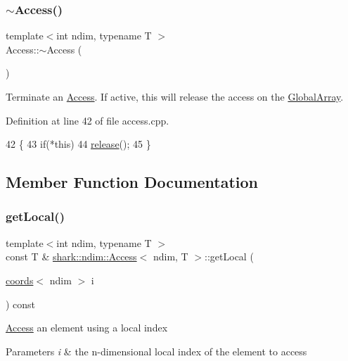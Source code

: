 \subsubsection{\texorpdfstring{$\sim$\+Access()}{~Access()}}
{\footnotesize\ttfamily template$<$int ndim, typename T $>$ \\
Access\+::$\sim$\+Access (\begin{DoxyParamCaption}{ }\end{DoxyParamCaption})}

Terminate an \hyperlink{classshark_1_1ndim_1_1_access}{Access}. If active, this will release the access on the \hyperlink{classshark_1_1ndim_1_1_global_array}{Global\+Array}. 

Definition at line 42 of file access.\+cpp.


\begin{DoxyCode}
42                         \{
43     \textcolor{keywordflow}{if}(*\textcolor{keyword}{this})
44         \hyperlink{classshark_1_1ndim_1_1_access_a22c889d50f5f45566ee12cf04f874701}{release}();
45 \}
\end{DoxyCode}


\subsection{Member Function Documentation}
\hypertarget{classshark_1_1ndim_1_1_access_a1701e437e4c435473672500f678f41ac}{}\label{classshark_1_1ndim_1_1_access_a1701e437e4c435473672500f678f41ac} 
\subsubsection{\texorpdfstring{get\+Local()}{getLocal()}\hspace{0.1cm}{\footnotesize\ttfamily [1/2]}}
{\footnotesize\ttfamily template$<$int ndim, typename T $>$ \\
const T \& \hyperlink{classshark_1_1ndim_1_1_access}{shark\+::ndim\+::\+Access}$<$ ndim, T $>$\+::get\+Local (\begin{DoxyParamCaption}\item[{\hyperlink{structshark_1_1ndim_1_1coords}{coords}$<$ ndim $>$}]{i }\end{DoxyParamCaption}) const\hspace{0.3cm}{\ttfamily [inline]}}

\hyperlink{classshark_1_1ndim_1_1_access}{Access} an element using a local index 
\begin{DoxyParams}{Parameters}
{\em i} & the n-\/dimensional local index of the element to access \\
\hline
\end{DoxyParams}


